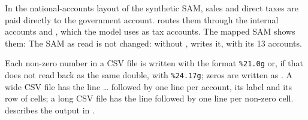 
In the national-accounts layout of the synthetic SAM, sales and direct taxes
are paid directly to the government account.  routes them
through the internal accounts  and , which the model
uses as tax accounts. The mapped SAM shows them:
The SAM as read is not changed: without , 
writes it, with its 13 accounts.


Each non-zero number in a CSV file is written with the format
\texttt{\%21.0g} or, if that does not read back as the same double, with
\texttt{\%24.17g}; zeros are written as . A wide CSV file has the line
\cmd{,}\dots{} followed by one line per
account, its label and its row of cells; a long CSV file has the line
 followed by one line per non-zero cell. 
describes the output in .


\begin{alsosee}
\end{alsosee}
